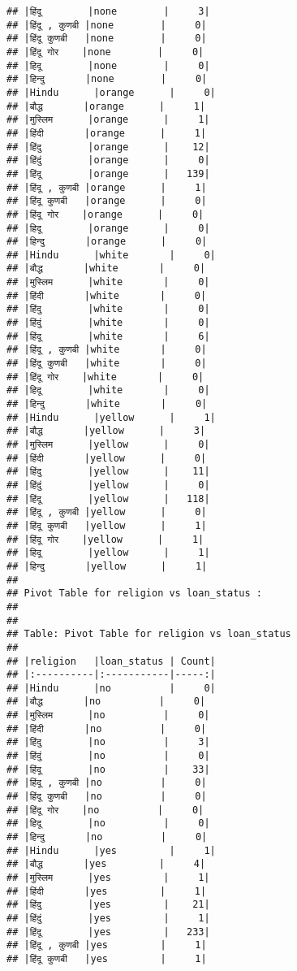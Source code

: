 \documentclass[
]{article}
\begin{document}
\begin{verbatim}
## |हिंदू        |none        |     3|
## |हिंदू , कुणबी |none        |     0|
## |हिंदू कुणबी   |none        |     0|
## |हिंदू गोर    |none        |     0|
## |हिदू        |none        |     0|
## |हिन्दु       |none        |     0|
## |Hindu      |orange      |     0|
## |बौद्ध       |orange      |     1|
## |मुस्लिम      |orange      |     1|
## |हिंदी       |orange      |     1|
## |हिंदु        |orange      |    12|
## |हिंदुं        |orange      |     0|
## |हिंदू        |orange      |   139|
## |हिंदू , कुणबी |orange      |     1|
## |हिंदू कुणबी   |orange      |     0|
## |हिंदू गोर    |orange      |     0|
## |हिदू        |orange      |     0|
## |हिन्दु       |orange      |     0|
## |Hindu      |white       |     0|
## |बौद्ध       |white       |     0|
## |मुस्लिम      |white       |     0|
## |हिंदी       |white       |     0|
## |हिंदु        |white       |     0|
## |हिंदुं        |white       |     0|
## |हिंदू        |white       |     6|
## |हिंदू , कुणबी |white       |     0|
## |हिंदू कुणबी   |white       |     0|
## |हिंदू गोर    |white       |     0|
## |हिदू        |white       |     0|
## |हिन्दु       |white       |     0|
## |Hindu      |yellow      |     1|
## |बौद्ध       |yellow      |     3|
## |मुस्लिम      |yellow      |     0|
## |हिंदी       |yellow      |     0|
## |हिंदु        |yellow      |    11|
## |हिंदुं        |yellow      |     0|
## |हिंदू        |yellow      |   118|
## |हिंदू , कुणबी |yellow      |     0|
## |हिंदू कुणबी   |yellow      |     1|
## |हिंदू गोर    |yellow      |     1|
## |हिदू        |yellow      |     1|
## |हिन्दु       |yellow      |     1|
## 
## Pivot Table for religion vs loan_status :
## 
## 
## Table: Pivot Table for religion vs loan_status
## 
## |religion   |loan_status | Count|
## |:----------|:-----------|-----:|
## |Hindu      |no          |     0|
## |बौद्ध       |no          |     0|
## |मुस्लिम      |no          |     0|
## |हिंदी       |no          |     0|
## |हिंदु        |no          |     3|
## |हिंदुं        |no          |     0|
## |हिंदू        |no          |    33|
## |हिंदू , कुणबी |no          |     0|
## |हिंदू कुणबी   |no          |     0|
## |हिंदू गोर    |no          |     0|
## |हिदू        |no          |     0|
## |हिन्दु       |no          |     0|
## |Hindu      |yes         |     1|
## |बौद्ध       |yes         |     4|
## |मुस्लिम      |yes         |     1|
## |हिंदी       |yes         |     1|
## |हिंदु        |yes         |    21|
## |हिंदुं        |yes         |     1|
## |हिंदू        |yes         |   233|
## |हिंदू , कुणबी |yes         |     1|
## |हिंदू कुणबी   |yes         |     1|

\end{verbatim}
\end{document}
